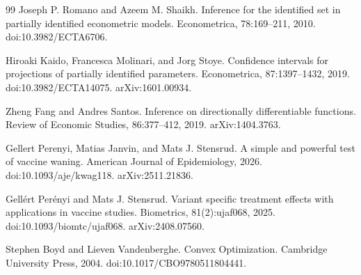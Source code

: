 \documentclass{article}
\begin{document}
\begin{thebibliography}{99}
   Joseph P. Romano and Azeem M. Shaikh. Inference for the identified set in partially identified econometric models. Econometrica, 78:169--211, 2010. doi:10.3982/ECTA6706.

   Hiroaki Kaido, Francesca Molinari, and Jorg Stoye. Confidence intervals for projections of partially identified parameters. Econometrica, 87:1397--1432, 2019. doi:10.3982/ECTA14075. arXiv:1601.00934.

   Zheng Fang and Andres Santos. Inference on directionally differentiable functions. Review of Economic Studies, 86:377--412, 2019. arXiv:1404.3763.

   Gellert Perenyi, Matias Janvin, and Mats J. Stensrud. A simple and powerful test of vaccine waning. American Journal of Epidemiology, 2026. doi:10.1093/aje/kwag118. arXiv:2511.21836.

   Gellért Perényi and Mats J. Stensrud. Variant specific treatment effects with applications in vaccine studies. Biometrics, 81(2):ujaf068, 2025. doi:10.1093/biomtc/ujaf068. arXiv:2408.07560.

   Stephen Boyd and Lieven Vandenberghe. Convex Optimization. Cambridge University Press, 2004. doi:10.1017/CBO9780511804441.

\end{thebibliography}
\end{document}
